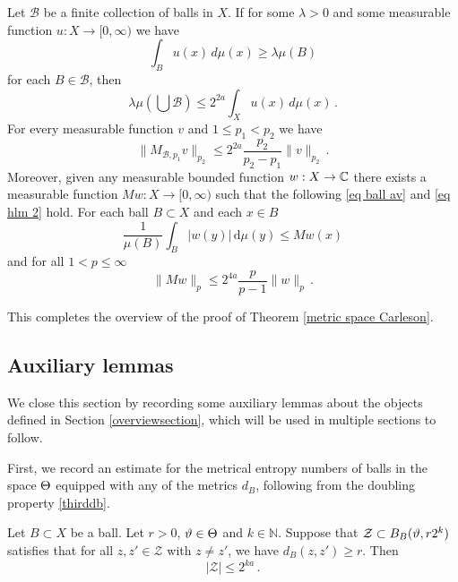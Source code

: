 \begin{prop}\label{Hardy Littlewood}
   Let $\mathcal{B}$ be a finite collection of balls in $X$.
If for some $\lambda>0$ and some measurable function $u:X\to [0,\infty)$ we have
\begin{equation}\label{eq ball assumption}
\int_{B} u(x)\, d\mu(x)\ge \lambda \mu(B)
\end{equation}
   for each $B\in \mathcal{B}$,
   then
   \begin{equation}\label{eq besico}
\lambda \mu(\bigcup \mathcal{B}) \le 2^{2a}\int_X u(x)\, d\mu(x)\, .
\end{equation}
For every measurable function $v$
and $1\le p_1<p_2$ we have
\begin{equation}\label{eq hlm}
    \|M_{\mathcal{B},p_1} v\|_{p_2}\le 2^{2a}\frac{p_2}{p_2-p_1} \|v\|_{p_2}\, .
\end{equation}
Moreover, given any measurable bounded function $w: X \to \mathbb{C}$ there exists a measurable function $Mw: X \to [0, \infty)$ such that the following \eqref{eq ball av} and \eqref{eq hlm 2} hold. For each ball $B \subset X$ and each $x \in B$
\begin{equation}
    \label{eq ball av}
    \frac{1}{\mu(B)} \int_{B}  |w(y)| \, \mathrm{d}\mu(y) \le Mw(x)
\end{equation}
and for all $1 < p \le \infty$
\begin{equation}
    \label{eq hlm 2}
    \|Mw\|_p \le 2^{4a} \frac{p}{p-1}\|w\|_p\,.
\end{equation}


\end{prop}

This completes the overview of the proof of Theorem \ref{metric space Carleson}.

\subsection{Auxiliary lemmas}
\label{global auxiliary lemmas}
We close this section by recording some auxiliary lemmas about the objects defined in Section \ref{overviewsection}, which will be used in multiple sections to follow.

First, we record an estimate for the metrical entropy numbers of balls in the space $\Theta$ equipped with any of the metrics $d_B$, following from the doubling property \eqref{thirddb}.

\begin{lemma}
    \label{lem entropy Theta}
    Let $B \subset X$ be a ball. Let $r > 0$, $\vartheta \in \Theta$ and $k \in \mathbb{N}$. Suppose that $\mathcal{Z} \subset B_B(\vartheta, r2^k)$  satisfies that for all $z, z' \in \mathcal{Z}$ with $z \ne z'$, we have $d_B(z,z') \ge r$. Then
    $$
        |\mathcal{Z}| \le 2^{ka}\,.
    $$
\end{lemma}

